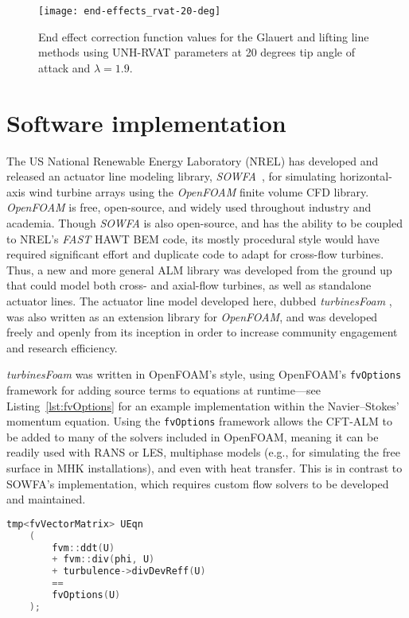 \begin{figure}
    \centering

    \texttt{[image: end-effects\_rvat-20-deg]}

    \caption{End effect correction function values for the Glauert and lifting
        line methods using UNH-RVAT parameters at 20 degrees tip angle of attack and
        $\lambda=1.9$.}

    \label{fig:end-effects}
\end{figure}


\section{Software implementation}

The US National Renewable Energy Laboratory (NREL) has developed and released an
actuator line modeling library, \textit{SOWFA}~\cite{Churchfield2014b}, for
simulating horizontal-axis wind turbine arrays using the \textit{OpenFOAM}
finite volume CFD library. \textit{OpenFOAM} is free, open-source, and widely
used throughout industry and academia. Though \textit{SOWFA} is also
open-source, and has the ability to be coupled to NREL's \textit{FAST} HAWT BEM
code, its mostly procedural style would have required significant effort and
duplicate code to adapt for cross-flow turbines. Thus, a new and more general
ALM library was developed from the ground up that could model both cross- and
axial-flow turbines, as well as standalone actuator lines. The actuator line
model developed here, dubbed \textit{turbinesFoam}
\cite{Bachant2016-turbinesFoam}, was also written as an extension library for
\textit{OpenFOAM}, and was developed freely and openly from its inception in
order to increase community engagement and research efficiency.

\textit{turbinesFoam} was written in OpenFOAM's style, using OpenFOAM's
\texttt{fvOptions} framework for adding source terms to equations at
runtime---see Listing~\ref{lst:fvOptions} for an example implementation within
the Navier--Stokes' momentum equation. Using the \texttt{fvOptions} framework
allows the CFT-ALM to be added to many of the solvers included in OpenFOAM,
meaning it can be readily used with RANS or LES, multiphase models (e.g., for
simulating the free surface in MHK installations), and even with heat transfer.
This is in contrast to SOWFA's implementation, which requires custom flow
solvers to be developed and maintained.

\begin{lstlisting}[float,language=C++,caption=Adding source terms to the momentum equation in OpenFOAM.,label=lst:fvOptions]
    tmp<fvVectorMatrix> UEqn
    (
        fvm::ddt(U)
        + fvm::div(phi, U)
        + turbulence->divDevReff(U)
        ==
        fvOptions(U)
    );
\end{lstlisting}

